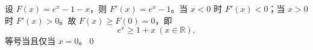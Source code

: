 设 $F(x)=e^x-1-x$，则 $F'(x)=e^x-1$。当 $x<0$ 时 $F'(x)<0$；当 $x>0$ 时 $F'(x)>0$。故 $F(x)\ge F(0)=0$，即
\[
\boxed{e^x\ge1+x\ (x\in\mathbb R),}
\]
等号当且仅当 $x=0$。\qed
